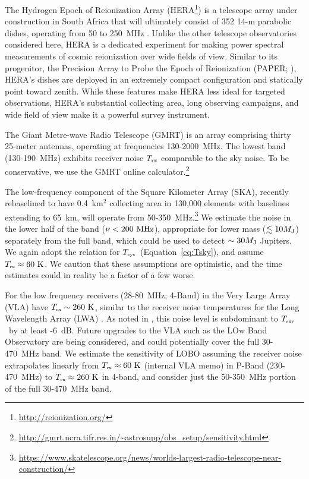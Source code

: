 \documentclass[iop,numberedappendix,apj]{emulateapj}
\newcommand{\Tsky}{\mbox{$T_{\mbox{\tiny sky}}$}}
\newcommand{\Tsys}{\mbox{$T_{\mbox{\tiny sys}}$}}
\newcommand{\Trx}{\mbox{$T_{\mbox{\tiny rx}}$}}
\begin{document}
The Hydrogen Epoch of Reionization Array (HERA\footnote{\url{http://reionization.org/}}) is a telescope array under construction in South Africa that will ultimately consist of 352 14-m parabolic dishes, operating from 50 to 250~MHz \citep{pober_et_al2014}.
Unlike the other telescope observatories considered here, HERA is a dedicated experiment for making power spectral measurements of cosmic reionization over wide fields of view.
Similar to its progenitor, the Precision Array to Probe the Epoch of Reionization (PAPER; \citealt{parsons_et_al2010}), HERA's dishes are deployed in an extremely compact configuration \citep{parsons_et_al2012} and statically point toward zenith.
While these features make HERA less ideal for targeted observations, HERA's substantial collecting area, long observing campaigns, and wide field of view make it a powerful survey instrument.

The Giant Metre-wave Radio Telescope (GMRT) is an array comprising thirty 25-meter antennas, operating at frequencies 130-2000~MHz.
The lowest band (130-190~MHz) exhibits receiver noise $T_{\rm rx}$ comparable to the sky noise.
To be conservative, we use the GMRT online calculator.\footnote{\url{http://gmrt.ncra.tifr.res.in/~astrosupp/obs\_setup/sensitivity.html}}


The low-frequency component of the Square Kilometer Array (SKA), recently rebaselined to have 0.4~km$^2$ collecting area in 130,000 elements with baselines extending to 65~km, will operate from 50-350~MHz.\footnote{\url{https://www.skatelescope.org/news/worlds-largest-radio-telescope-near-construction/}}
We estimate the noise in the lower half of the band ($\nu<200~\rm MHz$), appropriate for lower mass ($\lesssim 10 M_{\rm J}$) separately from the full band, which could be used to detect $\sim 30 M_{\rm J}$ Jupiters.
We again adopt the \cite{Rogers+Bowman2008} relation for \Tsys\ (Equation~\ref{eq:Tsky}), and assume $\Trx \approx 60~\rm K$.
We caution that these assumptions are optimistic, and the time estimates could in reality be a factor of a few worse.

For the low frequency receivers (28-80~MHz; 4-Band) in the Very Large Array (VLA) have $\Trx \sim 260~\rm K$, similar to the receiver noise temperatures for the Long Wavelength Array (LWA) \citep{Hicks2012}.  As noted in \citep{Hicks2012}, this noise level is subdominant to \Tsky\ by at least -6~dB.
Future upgrades to the VLA such as the LOw Band Observatory \citep[LOBO][]{Kassim2015IAU} are being considered, and could potentially cover the full 30-470~MHz band.
We estimate the sensitivity of LOBO assuming the receiver noise extrapolates linearly from $\Trx \approx 60~\rm K$ (internal VLA memo) in P-Band (230-470~MHz) to $\Trx \approx 260~\rm K$ in 4-band, and consider just the 50-350~MHz portion of the full 30-470~MHz band.
\end{document}
